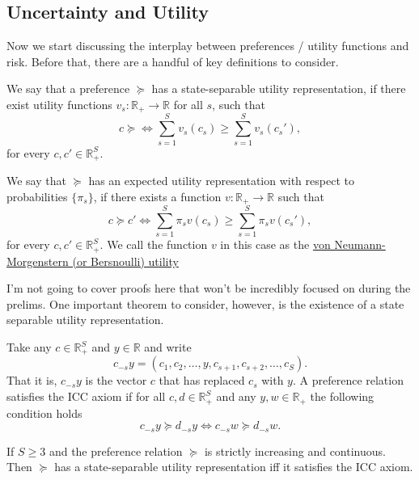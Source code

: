 \documentclass[11pt,english]{article}
\begin{document}
\subsection{Uncertainty and Utility}
Now we start discussing the interplay between preferences / utility functions and risk. Before that, there are a handful of key definitions to consider.
\begin{definition}
We say that a preference $\succeq$ has a state-separable utility representation, if there exist utility functions $v_s:\mathbb{R}_+ \to \mathbb{R}$ for all $s$, such that $$c \succeq \Longleftrightarrow \sum_{s = 1}^S v_s(c_s) \geq \sum_{s=1}^S v_s(c_s'),$$ for every $c,c'\in \mathbb{R}_+^S.$
\end{definition}

\begin{definition}
We say that $\succeq$ has an expected utility representation with respect to probabilities $\{\pi_s\}$, if there exists a function $v:\mathbb{R}_+ \to \mathbb{R}$ such that $$c\succeq c' \Longleftrightarrow \sum_{s=1}^S\pi_sv(c_s) \geq \sum_{s=1}^S \pi_s v(c_s'),$$ for every $c,c'\in \mathbb{R}_+^S$. We call the function $v$ in this case as the \underline{von Neumann-Morgenstern (or Bersnoulli) utility}
\end{definition}

I'm not going to cover proofs here that won't be incredibly focused on during the prelims. One important theorem to consider, however, is the existence of a state separable utility representation.
\begin{definition}
Take any $c\in \mathbb{R}_+^S$ and $y\in \mathbb{R}$ and write $$c_{-s}y = (c_1,c_2,\ldots, y, c_{s+1}, c_{s+2}, \ldots, c_S).$$ That it is, $c_{-s}y$ is the vector $c$ that has replaced $c_s$ with $y$. A preference relation satisfies the ICC axiom if for all $c,d\in \mathbb{R}_+^S$ and any $y,w\in \mathbb{R}_+$ the following condition holds $$c_{-s}y\succeq d_{-s}y \Longleftrightarrow c_{-s}w \succeq d_{-s}w.$$
\end{definition}

\begin{theorem}[Theorem 16.1]
If $S \geq 3$ and the preference relation $\succeq$ is strictly increasing and continuous. Then $\succeq$ has a state-separable utility representation iff it satisfies the ICC axiom.
\end{theorem}
\end{document}
